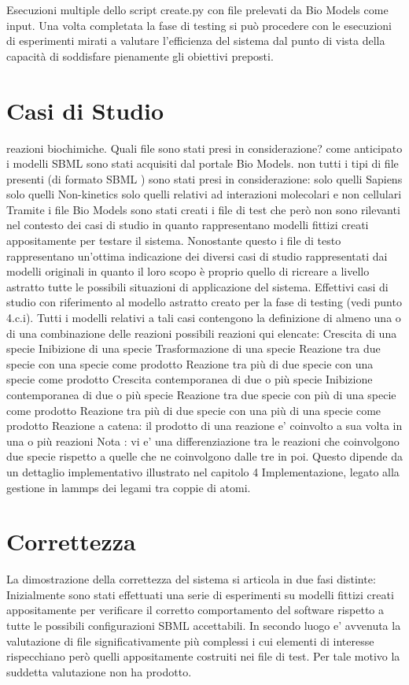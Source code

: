 \documentclass[Lau, oneside]{sapthesis}
\begin{document}
Esecuzioni multiple dello script create.py con file prelevati da Bio Models come input.
Una volta completata la fase di testing si può procedere con le esecuzioni di esperimenti mirati a valutare l'efficienza del sistema dal punto di vista della capacità di soddisfare pienamente gli obiettivi preposti.


\newpage
\section{Casi di Studio}
\label{sec:cast}
reazioni biochimiche.
Quali file sono stati presi in considerazione?
come anticipato i modelli SBML sono stati acquisiti dal portale Bio Models.
non tutti i tipi di file presenti (di formato SBML ) sono stati presi in considerazione:
solo quelli Sapiens
solo quelli Non-kinetics
solo quelli relativi ad interazioni molecolari e non cellulari
Tramite i file Bio Models sono stati creati i file di test che però non sono rilevanti nel contesto dei casi di studio in quanto rappresentano modelli fittizi creati appositamente per testare il sistema.
Nonostante questo i file di testo rappresentano un'ottima indicazione dei diversi casi di studio rappresentati dai modelli originali in quanto il loro scopo è proprio quello di ricreare a livello astratto tutte le possibili situazioni di applicazione del sistema.
Effettivi casi di studio con riferimento al modello astratto creato per la fase di testing (vedi punto 4.c.i). Tutti i modelli relativi a tali casi contengono la definizione di almeno una o di una combinazione delle reazioni possibili reazioni qui elencate:
Crescita di una specie
Inibizione di una specie
Trasformazione di una specie
Reazione tra due specie con una specie come prodotto 
Reazione tra più di due specie con una specie come prodotto
Crescita contemporanea di due o più specie
Inibizione contemporanea di due o più specie 
Reazione tra due specie con più di una specie come prodotto 
Reazione tra più di due specie con una più di una specie come prodotto
Reazione a catena: il prodotto di una reazione e’ coinvolto a sua volta in una o più reazioni
Nota : vi e’ una differenziazione tra le reazioni che coinvolgono due specie rispetto a quelle che ne coinvolgono dalle tre in poi. Questo dipende da un dettaglio implementativo illustrato nel capitolo  4 Implementazione, legato alla gestione in lammps dei legami tra coppie di atomi.


\newpage
\section{Correttezza}
\label{sec:corr}
La dimostrazione della correttezza del sistema si articola in due fasi distinte:
Inizialmente sono stati effettuati una serie di esperimenti su modelli fittizi creati appositamente per verificare il corretto comportamento del software rispetto a tutte le possibili configurazioni SBML accettabili.
In secondo luogo e' avvenuta la valutazione di file significativamente più complessi i cui elementi di interesse rispecchiano però quelli appositamente costruiti nei file di test. Per tale motivo la suddetta valutazione non ha prodotto.
\end{document}
